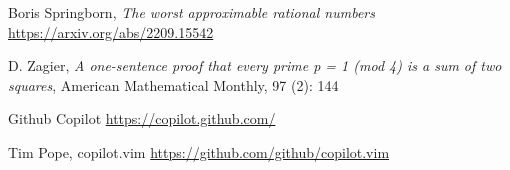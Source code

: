 \documentclass[12pt]{amsart}
\theoremstyle{plain}
\theoremstyle{definition}
\begin{document}
Boris Springborn,
\textit{The worst approximable rational numbers}
\url{https://arxiv.org/abs/2209.15542}




D. Zagier,
 \textit{A one-sentence proof that every prime p = 1 (mod 4) is a sum of two squares}, 
 American Mathematical Monthly, 97 (2): 144

 Github Copilot \url{https://copilot.github.com/}

Tim Pope, copilot.vim \url{https://github.com/github/copilot.vim}
 

 
\end{document}
